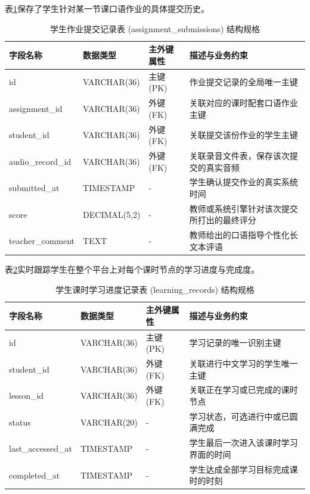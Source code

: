 表\ref{tab:db-assignment-submissions}保存了学生针对某一节课口语作业的具体提交历史。

\begin{table}[H]
\centering
\caption{学生作业提交记录表 (assignment\_submissions) 结构规格}
\label{tab:db-assignment-submissions}
\begin{tabularx}{\textwidth}{lllX}
\toprule
字段名称 & 数据类型 & 主外键属性 & 描述与业务约束 \\
\midrule
id & VARCHAR(36) & 主键 (PK) & 作业提交记录的全局唯一主键 \\
assignment\_id & VARCHAR(36) & 外键 (FK) & 关联对应的课时配套口语作业主键 \\
student\_id & VARCHAR(36) & 外键 (FK) & 关联提交该份作业的学生主键 \\
audio\_record\_id & VARCHAR(36) & 外键 (FK) & 关联录音文件表，保存该次提交的真实音频 \\
submitted\_at & TIMESTAMP & - & 学生确认提交作业的真实系统时间 \\
score & DECIMAL(5,2) & - & 教师或系统引擎针对该次提交所打出的最终评分 \\
teacher\_comment & TEXT & - & 教师给出的口语指导个性化长文本评语 \\
\bottomrule
\end{tabularx}
\end{table}

表\ref{tab:db-learning-records}实时跟踪学生在整个平台上对每个课时节点的学习进度与完成度。

\begin{table}[H]
\centering
\caption{学生课时学习进度记录表 (learning\_records) 结构规格}
\label{tab:db-learning-records}
\begin{tabularx}{\textwidth}{lllX}
\toprule
字段名称 & 数据类型 & 主外键属性 & 描述与业务约束 \\
\midrule
id & VARCHAR(36) & 主键 (PK) & 学习记录的唯一识别主键 \\
student\_id & VARCHAR(36) & 外键 (FK) & 关联进行中文学习的学生唯一主键 \\
lesson\_id & VARCHAR(36) & 外键 (FK) & 关联正在学习或已完成的课时节点 \\
status & VARCHAR(20) & - & 学习状态，可选进行中或已圆满完成 \\
last\_accessed\_at & TIMESTAMP & - & 学生最后一次进入该课时学习界面的时间 \\
completed\_at & TIMESTAMP & - & 学生达成全部学习目标完成课时的时刻 \\
\bottomrule
\end{tabularx}
\end{table}

